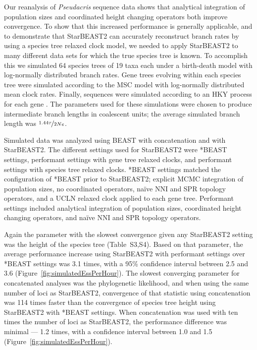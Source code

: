 \documentclass[12pt]{article}
\begin{document}
Our reanalysis of \textit{Pseudacris} sequence data shows that analytical
integration of population sizes and coordinated height changing operators both
improve convergence. To show that this increased performance is generally
applicable, and to demonstrate that StarBEAST2 can accurately reconstruct branch
rates by using a species tree relaxed clock model, we needed to apply StarBEAST2 to
many different data sets for which the true species tree is known. To accomplish
this we simulated 64 species trees of 19 taxa each under a birth-death model
with log-normally distributed branch rates. Gene trees evolving within each
species tree were simulated according to the MSC model with
log-normally distributed mean clock rates. Finally, sequences were simulated
according to an HKY process for each gene \citep{Hasegawa1985, Goldman1993}. The
parameters used for these simulations were chosen to produce intermediate
branch lengths in coalescent units; the average simulated branch length was
$\nicefrac{1.44\tau}{2Ne}$.

Simulated data was analyzed using BEAST with concatenation and with StarBEAST2.
The different settings used for StarBEAST2 were *BEAST settings, performant
settings with gene tree relaxed clocks, and performant settings with species
tree relaxed clocks. *BEAST settings matched the configuration of *BEAST prior
to StarBEAST2; explicit MCMC integration of population sizes, no coordinated
operators, na\"ive NNI and SPR topology operators, and a UCLN relaxed clock
applied to each gene tree. Performant settings included analytical integration of
population sizes, coordinated height changing operators, and na\"ive NNI and SPR
topology operators.

Again the parameter with the slowest convergence given any StarBEAST2 setting
was the height of the species tree (Table~S3,S4). Based on that parameter, the
average performance increase using StarBEAST2 with performant settings over
*BEAST settings was 3.1 times, with a 95\% confidence interval between 2.5 and
3.6 (Figure~\ref{fig:simulatedEssPerHour}). The slowest converging parameter for
concatenated analyses was the phylogenetic likelihood, and when using the same
number of loci as StarBEAST2, convergence of that statistic using concatenation
was 114 times faster than the convergence of species tree height using
StarBEAST2 with *BEAST settings. When concatenation was used with ten times the
number of loci as StarBEAST2, the performance difference was minimal --- 1.2
times, with a confidence interval between 1.0 and 1.5
(Figure~\ref{fig:simulatedEssPerHour}).
\end{document}
